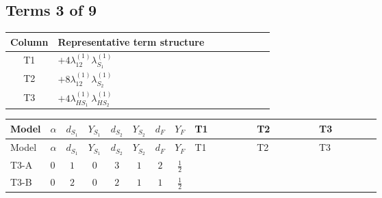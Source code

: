 \documentclass[8pt]{article}
\begin{document}
\begin{landscape}
\subsection*{Terms 3 of 9}
\begin{center}
\begin{tabular}{@{}c >{\raggedright\arraybackslash}p{0.82\linewidth}@{}}
\toprule
Column & Representative term structure \\
\midrule
T1 & \(\displaystyle +4 {\lambda_{12}^{(1)}} {\lambda_{S_1}^{(1)}}\) \\
\midrule
T2 & \(\displaystyle +8 {\lambda_{12}^{(1)}} {\lambda_{S_2}^{(1)}}\) \\
\midrule
T3 & \(\displaystyle +4 {\lambda_{HS_1}^{(1)}} {\lambda_{HS_2}^{(1)}}\) \\
\midrule
\bottomrule
\end{tabular}
\end{center}
\smallskip
\tiny
\begin{longtable}{@{}llcccccc >{\raggedright\arraybackslash}p{0.21\linewidth} >{\raggedright\arraybackslash}p{0.21\linewidth} >{\raggedright\arraybackslash}p{0.21\linewidth}@{}}
\toprule
Model & $\alpha$ & $d_{S_1}$ & $Y_{S_1}$ & $d_{S_2}$ & $Y_{S_2}$ & $d_F$ & $Y_F$ & T1 & T2 & T3 \\
\midrule
\endfirsthead
\toprule
Model & $\alpha$ & $d_{S_1}$ & $Y_{S_1}$ & $d_{S_2}$ & $Y_{S_2}$ & $d_F$ & $Y_F$ & T1 & T2 & T3 \\
\midrule
\endhead
T3-A & $0$ & $1$ & $0$ & $3$ & $1$ & $2$ & $\frac{1}{2}$ & \scriptsize\adjustbox{max width=\linewidth}{$\begin{gathered} +4 {\lambda_{12}^{(1)}} {\lambda_{S_1}^{(1)}}\end{gathered}$} & \scriptsize\adjustbox{max width=\linewidth}{$\begin{gathered} +8 {\lambda_{12}^{(1)}} {\lambda_{S_2}^{(1)}}\end{gathered}$} & \scriptsize\adjustbox{max width=\linewidth}{$\begin{gathered} +4 {\lambda_{HS_1}^{(1)}} {\lambda_{HS_2}^{(1)}}\end{gathered}$} \\
\midrule
T3-B & $0$ & $2$ & $0$ & $2$ & $1$ & $1$ & $\frac{1}{2}$ & \scriptsize\adjustbox{max width=\linewidth}{$\begin{gathered} +6 {\lambda_{12}^{(1)}} {\lambda_{S_1}^{(1)}}\end{gathered}$} & \scriptsize\adjustbox{max width=\linewidth}{$\begin{gathered} +6 {\lambda_{12}^{(1)}} {\lambda_{S_2}^{(1)}}\end{gathered}$} & \scriptsize\adjustbox{max width=\linewidth}{$\begin{gathered} +4 {\lambda_{HS_1}^{(1)}} {\lambda_{HS_2}^{(1)}}\end{gathered}$} \\

\end{longtable}
\end{landscape}
\end{document}
